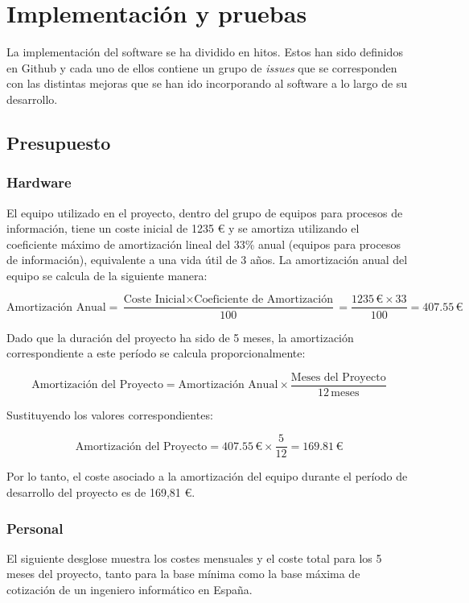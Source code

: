 \chapter{Implementación y pruebas}

La implementación del software se ha dividido en hitos. Estos han sido definidos en Github
y cada uno de ellos contiene un grupo de \textit{issues} que se corresponden con las distintas
mejoras que se han ido incorporando al software a lo largo de su desarrollo.


\section{Presupuesto}

\subsection{Hardware}

El equipo utilizado en el proyecto, dentro del grupo de equipos para procesos de información, tiene un coste inicial de 1235 € y se amortiza utilizando el coeficiente máximo de amortización lineal del 33\% anual (equipos para procesos de información)\cite{amortizacion}, equivalente a una vida útil de 3 años. La amortización anual del equipo se calcula de la siguiente manera:

\[
\text{Amortización Anual} = \frac{\text{Coste Inicial} \times \text{Coeficiente de Amortización}}{100} = \frac{1235 \, \text{€} \times 33}{100} = 407.55 \, \text{€}
\]

Dado que la duración del proyecto ha sido de 5 meses, la amortización correspondiente a este período se calcula proporcionalmente:

\[
\text{Amortización del Proyecto} = \text{Amortización Anual} \times \frac{\text{Meses del Proyecto}}{12 \, \text{meses}}
\]

Sustituyendo los valores correspondientes:

\[
\text{Amortización del Proyecto} = 407.55 \, \text{€} \times \frac{5}{12} = 169.81 \, \text{€}
\]

Por lo tanto, el coste asociado a la amortización del equipo durante el período de desarrollo del proyecto es de 169,81 €.

\subsection{Personal}
El siguiente desglose muestra los costes mensuales y el coste total para los 5 meses del proyecto, tanto para la base mínima como la base máxima de cotización de un ingeniero informático en España\cite{cotizacion}.

